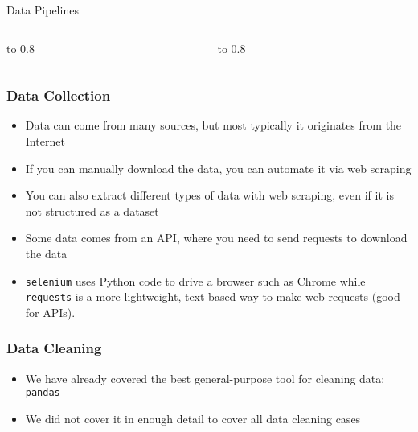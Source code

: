 \documentclass[handout, 11pt]{beamer}
\begin{document}
\begin{section}{Data Pipelines}
\begin{frame}
\begin{columns}
\begin{column}{0.5\textwidth}
\vbox to 0.8
\end{column}
\begin{column}{0.5\textwidth}
\vbox to 0.8
\end{column}
\end{columns}
\end{frame}
\begin{frame}
\frametitle{Data Collection}
\begin{itemize}
\item Data can come from many sources, but most typically it originates from the Internet
\vfill
\item If you can manually download the data, you can automate it via web scraping
\vfill
\item You can also extract different types of data with web scraping, even if it is not structured as a dataset
\vfill
\item Some data comes from an API, where you need to send requests to download the data
\vfill
\item \texttt{selenium}
uses Python code to drive a browser such as Chrome while
\texttt{requests}
is a more lightweight, text based way to make web requests (good for APIs).
\end{itemize}
\end{frame}
\begin{frame}
\frametitle{Data Cleaning}
\begin{itemize}
\item We have already covered the best general-purpose tool for cleaning data:
\texttt{pandas}
\vfill
\item We did not cover it in enough detail to cover all data cleaning cases

\end{itemize}
\end{frame}
\end{section}
\end{document}
